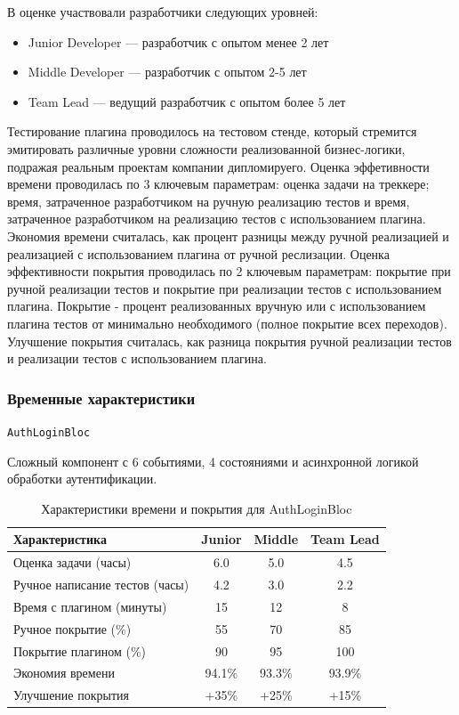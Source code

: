 \documentclass[14pt, russian]{scrartcl}
\begin{document}
В оценке участвовали разработчики следующих уровней:
\begin{itemize}
    \item Junior Developer — разработчик с опытом менее 2 лет
    \item Middle Developer — разработчик с опытом 2-5 лет  
    \item Team Lead — ведущий разработчик с опытом более 5 лет
\end{itemize}

Тестирование плагина проводилось на тестовом стенде, который стремится эмитировать различные уровни сложности реализованной бизнес-логики, подражая реальным проектам компании дипломируего.
Оценка эффетивности времени проводилась по 3 ключевым параметрам: оценка задачи на треккере; время, затраченное разработчиком на ручную реализацию тестов и время, затраченное разработчиком на реализацию тестов с использованием плагина. Экономия времени считалась, как процент
разницы между ручной реализацией и реализацией с использованием плагина от ручной реслизации.
Оценка эффективности покрытия проводилась по 2 ключевым параметрам: покрытие при ручной реализации тестов и покрытие при реализации тестов с использованием плагина. Покрытие - процент реализованных вручную или с использованием плагина тестов от минимально необходимого (полное покрытие всех переходов).
Улучшение покрытия считалась, как разница покрытия ручной реализации тестов и реализации тестов с использованием плагина.

\subsubsection{Временные характеристики}

\texttt{AuthLoginBloc}

Сложный компонент с 6 событиями, 4 состояниями и асинхронной логикой обработки аутентификации.

\begin{table}[h!]
\centering
\caption{Характеристики времени и покрытия для AuthLoginBloc}
\begin{tabular}{|l|c|c|c|}
\hline
Характеристика & Junior & Middle & Team Lead \\
\hline
Оценка задачи (часы) & 6.0 & 5.0 & 4.5 \\
Ручное написание тестов (часы) & 4.2 & 3.0 & 2.2 \\
Время с плагином (минуты) & 15 & 12 & 8 \\
Ручное покрытие (\%) & 55 & 70 & 85 \\
Покрытие плагином (\%) & 90 & 95 & 100 \\
Экономия времени & 94.1\% & 93.3\% & 93.9\% \\
Улучшение покрытия & +35\% & +25\% & +15\% \\
\hline
\end{tabular}
\vspace{1ex}
\end{table}
\end{document}
